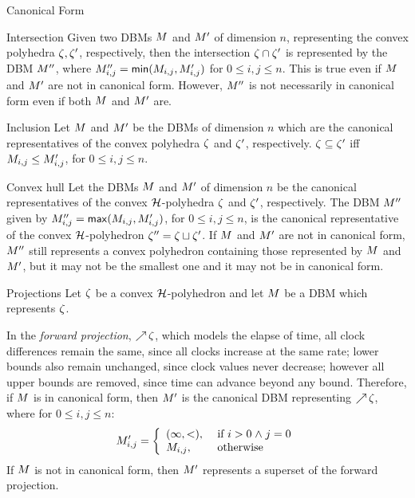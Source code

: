 {\begin{paragraph}{Canonical Form}
\end{paragraph}
 
\begin{paragraph}{Intersection}
Given two DBMs ${M}$ and ${M}'$ of dimension $n$, representing the
convex polyhedra ${\zeta}, {\zeta}'$, respectively, then the intersection
${\zeta} \cap {\zeta}'$ is represented by the DBM ${M}''$,
where ${M}''_{i,j} = \mathop{{\sf min}}(M_{i,j},{M}'_{i,j})$ for $0 \leq i,j \leq n$.
This is true even if ${M}$ and ${M}'$ are not in canonical form. However,
${M}''$ is not necessarily in canonical form even if both ${M}$ and ${M}'$ are.
\end{paragraph}

\begin{paragraph}{Inclusion}
Let ${M}$ and ${M}'$ be the DBMs of dimension $n$ which are the
canonical representatives of the convex polyhedra ${\zeta}$ and
${\zeta}'$, respectively. ${\zeta} \subseteq {\zeta}'$ iff ${M}_{i,j}
\leq {M}'_{i,j}$, for $0 \leq i,j \leq n$.
\end{paragraph}

\begin{paragraph}{Convex hull}
Let the DBMs ${M}$ and ${M}'$ of dimension $n$ be the canonical representatives 
of the convex $\clocks$-polyhedra ${\zeta}$ and ${\zeta}'$, respectively.
The DBM ${M}''$ given by ${M}''_{i,j} = \mathop{{\sf max}}({M}_{i,j},{M}'_{i,j})$, for $0
\leq i,j \leq n$, is the canonical representative of the convex 
$\clocks$-polyhedron ${\zeta}'' = {\zeta} \sqcup {\zeta}'$. If ${M}$
and ${M}'$ are not in canonical form, ${M}''$ still represents a convex
polyhedron containing those represented by ${M}$ and ${M}'$, but it may
not be the smallest one and it may not be in canonical form.
\end{paragraph}

\begin{paragraph}{Projections}
Let ${\zeta}$ be a convex $\clocks$-polyhedron and let ${M}$
be a DBM which represents ${\zeta}$. 

In the \emph{forward projection}, $\mathop{\nearrow}{{\zeta}}$, which
models the elapse of time, all clock differences remain the same,
since all clocks increase at the same rate; lower bounds also remain
unchanged, since clock values never decrease; however all upper bounds
are removed, since time can advance beyond any bound.  Therefore, if
${M}$ is in canonical form, then ${M}'$ is the canonical DBM
representing $\mathop{\nearrow}{{\zeta}}$, where for $0 \leq i,j \leq n$:
\[ {M}'_{i,j} = \left\{
  \begin{array}{ll}
    (\infty,<), & \text{ if } i > 0 \mathrel{\wedge} j = 0 \\
    {M}_{i,j}, & \text{ otherwise }
  \end{array} \right.
\]
If ${M}$ is not in canonical form, then ${M}'$ represents a superset
of the forward projection.


\end{paragraph}}
